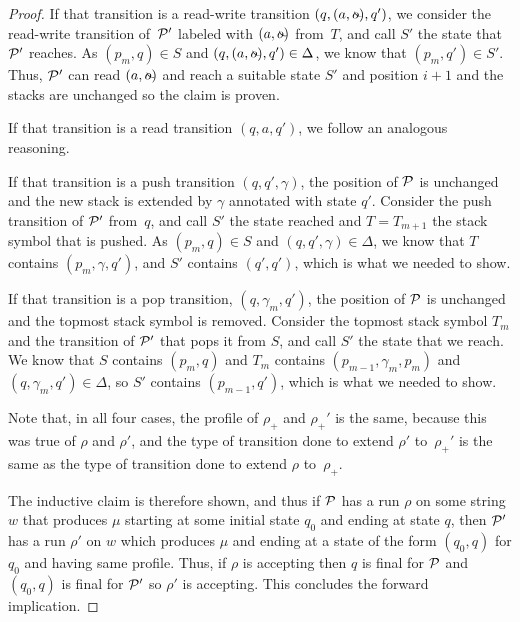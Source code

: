 \begin{proof}
        If that transition is a read-write transition $(q, (a, \oout), q')$, we consider
        the read-write transition of~$\mathcal{P}'$ labeled with $(a,\oout)$ from~$T$,
        and call $S'$ the state that $\mathcal{P}'$ reaches.
        As $(p_m, q) \in S$ and $(q, (a, \oout), q') \in \Delta$, we know that
        $(p_m, q') \in S'$. Thus, $\mathcal{P}'$ can read $(a,\oout)$ and
        reach a suitable state $S'$ and position $i+1$ and the stacks are
        unchanged so the claim is proven.
        
        If that transition is a read transition $(q, a, q')$, we follow an analogous reasoning.

        If that transition is a push transition $(q, q', \gamma)$, the position
        of $\mathcal{P}$ is unchanged and the new stack is extended by $\gamma$
        annotated with state $q'$. Consider the push transition of $\mathcal{P}'$
        from~$q$, and call $S'$ the state reached and $T = T_{m+1}$ the stack symbol that is
        pushed. As $(p_m, q) \in S$ and $(q, q', \gamma) \in \Delta$, we know
        that $T$ contains $(p_m, \gamma, q')$, and $S'$ contains $(q', q')$,
        which is what we needed to show.

        If that transition is a pop transition, $(q, \gamma_m, q')$, the position
        of $\mathcal{P}$ is unchanged and the topmost stack symbol is removed. Consider
        the topmost stack symbol $T_m$ and the transition of $\mathcal{P}'$ that pops
        it from $S$, and call $S'$ the state that we reach. We know that $S$
        contains $(p_m, q)$ and $T_m$ contains $(p_{m-1}, \gamma_m, p_m)$ and
        $(q, \gamma_m, q') \in \Delta$, so $S'$ contains $(p_{m-1}, q')$, which
        is what we needed to show.

        Note that, in all four cases, the profile of $\rho_+$ and $\rho_+'$ is
        the same, because this was true of $\rho$ and $\rho'$, and the type of
        transition done to extend $\rho'$ to~$\rho_+'$ is the same as the type
        of transition done to extend $\rho$ to~$\rho_+$.

        The inductive claim is therefore shown, and thus if $\mathcal{P}$ has a run $\rho$ on some string $w$ that produces $\mu$ starting at some initial state $q_0$ and
        ending at state $q$, then $\mathcal{P}'$ has a run $\rho'$
        on $w$ which produces $\mu$ and ending at a state of the form $(q_0,
        q)$ for $q_0$ and having same profile. Thus, if $\rho$ is accepting then $q$ is final for
        $\mathcal{P}$ and $(q_0, q)$ is final for $\mathcal{P}'$ so $\rho'$ is accepting.
        This concludes the forward implication.


\end{proof}
